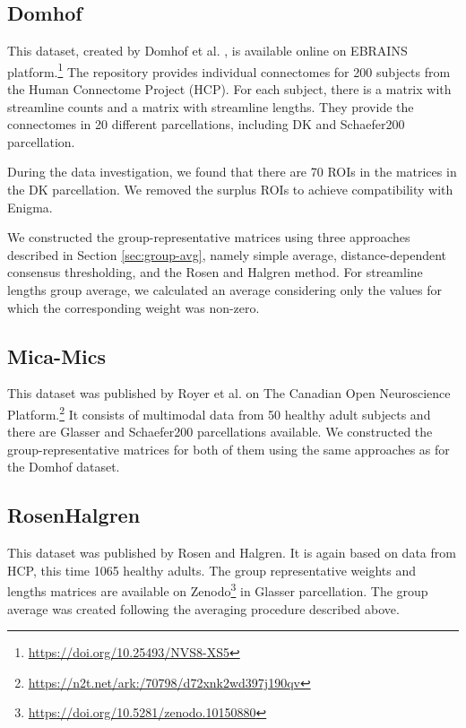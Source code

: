 \subsection{Domhof}

This dataset, created by Domhof et al. \cite{domhof_parcellation-based_2022}, is available online on EBRAINS platform.\footnote{\url{https://doi.org/10.25493/NVS8-XS5}} The repository provides individual connectomes for 200 subjects from the Human Connectome Project (HCP). For each subject, there is a matrix with streamline counts and a matrix with streamline lengths. They provide the connectomes in 20 different parcellations, including DK and Schaefer200 parcellation. 

During the data investigation, we found that there are 70 ROIs in the matrices in the DK parcellation. We removed the surplus ROIs to achieve compatibility with Enigma.

We constructed the group-representative matrices using three approaches described in Section \ref{sec:group-avg}, namely simple average, distance-dependent consensus thresholding, and the Rosen and Halgren method. For streamline lengths group average, we calculated an average considering only the values for which the corresponding weight was non-zero.

\subsection{Mica-Mics}

This dataset was published by Royer et al. \cite{royer_open_2021} on The Canadian Open Neuroscience Platform.\footnote{\url{https://n2t.net/ark:/70798/d72xnk2wd397j190qv}} It consists of multimodal data from 50 healthy adult subjects and there are Glasser and Schaefer200 parcellations available. We constructed the group-representative matrices for both of them using the same approaches as for the Domhof dataset.

\subsection{RosenHalgren}

This dataset was published by Rosen and Halgren. \cite{rosen_whole-cortex_2021} It is again based on data from HCP, this time 1065 healthy adults. The group representative weights and lengths matrices are available on Zenodo\footnote{\url{https://doi.org/10.5281/zenodo.10150880}} in Glasser parcellation. The group average was created following the averaging procedure described above. 

